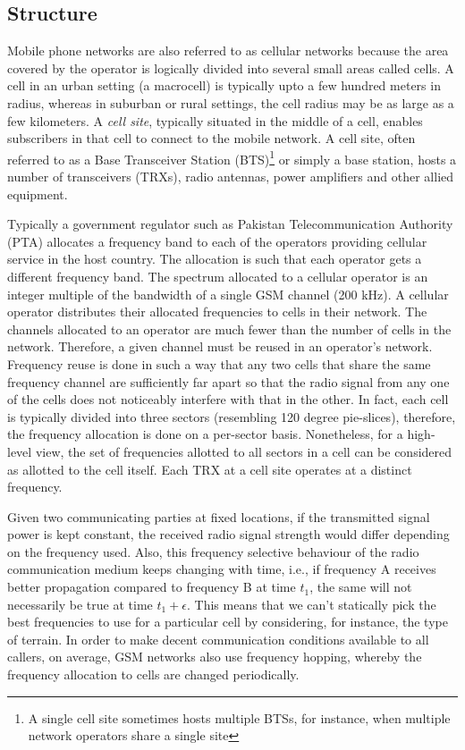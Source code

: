 \subsection{Structure} %
Mobile phone networks are also referred to as cellular networks because the area covered by the operator is logically divided into several small areas called cells. A cell in an urban setting (a macrocell) is typically upto a few hundred meters in radius, whereas in suburban or rural settings, the cell radius may be as large as a few kilometers. A \textit{cell site}, typically situated in the middle of a cell, enables subscribers in that cell to connect to the mobile network. A cell site, often referred to as a Base Transceiver Station (BTS)\footnote{A single cell site sometimes hosts multiple BTSs, for instance, when multiple network operators share a single site} or simply a base station, hosts a number of transceivers (TRXs), radio antennas, power amplifiers and other allied equipment. 

Typically a government regulator such as Pakistan Telecommunication Authority (PTA) allocates a frequency band to each of the operators providing cellular service in the host country. The allocation is such that each operator gets a different frequency band. The spectrum allocated to a cellular operator is an integer multiple of the bandwidth of a single GSM channel (200 kHz). A cellular operator distributes their allocated frequencies to cells in their network. The channels allocated to an operator are much fewer than the number of cells in the network. Therefore, a given channel must be reused in an operator's network. Frequency reuse is done in such a way that any two cells that share the same frequency channel are sufficiently far apart so that the radio signal from any one of the cells does not noticeably interfere with that in the other. In fact, each cell is typically divided into three sectors (resembling 120 degree pie-slices), therefore, the frequency allocation is done on a per-sector basis. Nonetheless, for a high-level view, the set of frequencies allotted to all sectors in a cell can be considered as allotted to the cell itself. Each TRX at a cell site operates at a distinct frequency.

Given two communicating parties at fixed locations, if the transmitted signal power is kept constant, the received radio signal strength would differ depending on the frequency used. Also, this frequency selective behaviour of the radio communication medium keeps changing with time, i.e., if frequency A receives better propagation compared to frequency B at time $t_1$, the same will not necessarily be true at time $t_1+\epsilon$. This means that we can't statically pick the best frequencies to use for a particular cell by considering, for instance, the type of terrain. In order to make decent communication conditions available to all callers, on average, GSM networks also use frequency hopping, whereby the frequency allocation to cells are changed periodically. 

